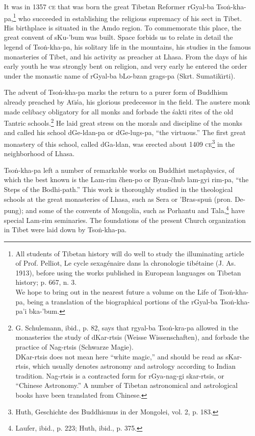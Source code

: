 \documentclass[a4paper, 12pt, oneside]{article}
\begin{document}
It was in 1357 \textsc{ce} that was born the great Tibetan Reformer rGyal-ba Tso\.{n}-kha-pa,\footnote{All students of Tibetan history will do well to study the illuminating article of Prof. Pelliot, Le cycle sexagénaire dans la chronologie tibétaine (J. As. 1913), before using the works published in European languages on Tibetan history; p. 667, n. 3.\\\hspace*{5mm}We hope to bring out in the nearest future a volume on the Life of Tso\.{n}-kha-pa, being a translation of the biographical portions of the rGyal-ba Tso\.{n}-kha-pa'i bka-'bum.} who succeeded in establishing the religious supremacy of his sect in Tibet. His birthplace is situated in the Amdo region. To commemorate this place, the great convent of sKu-'bum was built. Space forbids us to relate in detail the legend of Tso\.{n}-kha-pa, his solitary life in the mountains, his studies in the famous monasteries of Tibet, and his activity as preacher at Lhasa. From the days of his early youth he was strongly bent on religion, and very early he entered the order under the monastic name of rGyal-ba bLo-bzan grags-pa (Skrt. Sumatik\={\i}rti).

The advent of Tso\.{n}-kha-pa marks the return to a purer form of Buddhism already preached by At\={\i}\'{s}a, his glorious predecessor in the field. The austere monk made celibacy obligatory for all monks and forbade the \'{s}akti rites of the old Tantric schools.\footnote{G. Schulemann, ibid., p. 82, says that rgyal-ba Tso\.{n}-kra-pa allowed in the monasteries the study of dKar-rtsis (Weisse Wissenschaften), and forbade the practice of Nag-rtsis (Schwarze Magie).\\\hspace*{5mm}DKar-rtsis does not mean here ``white magic,'' and should be read as sKar-rtsis, which usually denotes astronomy and astrology according to Indian tradition. Nag-rtsis is a contracted form for rGya-nag-gi skar-rtsis, or ``Chinese Astronomy.'' A number of Tibetan astronomical and astrological books have been translated from Chinese.} He laid great stress on the morals and discipline of the monks and called his school dGe-ldan-pa or dGe-lugs-pa, ``the virtuous.'' The first great monastery of this school, called dGa-ldan, was erected about 1409 \textsc{ce}\footnote{Huth, Geschichte des Buddhismus in der Mongolei, vol. 2, p. 183.} in the neighborhood of Lhasa.

Tso\.{n}-kha-pa left a number of remarkable works on Buddhist metaphysics, of which the best known is the Lam-rim čhen-po or Byan-čhub lam-gyi rim-pa, ``the Steps of the Bodhi-path.'' This work is thoroughly studied in the theological schools at the great monasteries of Lhasa, such as Sera or 'Bras-spu\.{n} (pron. De-pung); and some of the convents of Mongolia, such as Porhantu and Tala,\footnote{Laufer, ibid., p. 223; Huth, ibid., p. 375.} have special Lam-rim seminaries. The foundations of the present Church organization in Tibet were laid down by Tso\.{n}-kha-pa.
\end{document}
